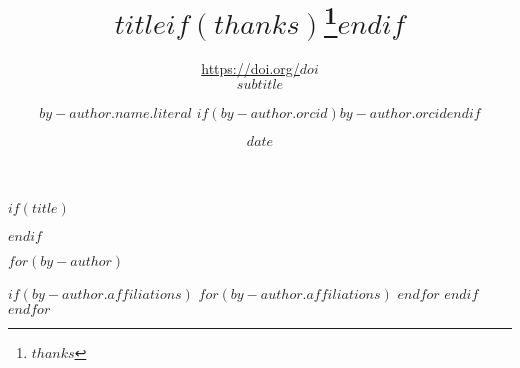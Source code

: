 $if(title)$
\title{$title$$if(thanks)$\thanks{$thanks$}$endif$}
$endif$

\subtitle{
\href{https://doi.org/$doi$}{https://doi.org/$doi$}\\
$subtitle$
}

\date{$date$}

$for(by-author)$
  \author{$by-author.name.literal$
  $if(by-author.orcid)$\href{https://orcid.org/$by-author.orcid$}{\small $by-author.orcid$}$endif$}
  $if(by-author.affiliations)$
    $for(by-author.affiliations)$
    $endfor$
  $endif$
$endfor$
